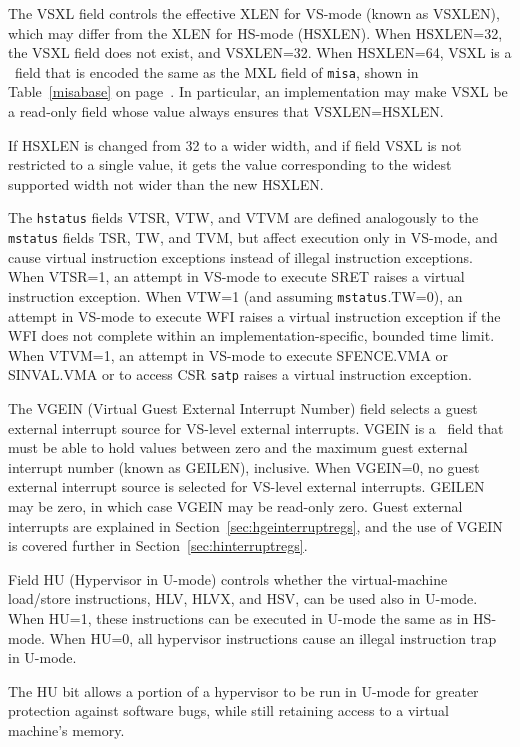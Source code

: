 The VSXL field controls the effective XLEN for VS-mode (known as VSXLEN),
which may differ from the XLEN for HS-mode (HSXLEN).
When HSXLEN=32, the VSXL field does not exist, and VSXLEN=32.
When HSXLEN=64, VSXL is a \warl\ field that is encoded the same as the
MXL field of {\tt misa}, shown in Table~\ref{misabase} on
page~\pageref{misabase}.
In particular, an implementation may make VSXL be a read-only field whose
value always ensures that VSXLEN=HSXLEN.

If HSXLEN is changed from 32 to a wider width, and if field VSXL is not
restricted to a single value, it gets the value corresponding to the
widest supported width not wider than the new HSXLEN.

The {\tt hstatus} fields VTSR, VTW, and VTVM are defined analogously to the
{\tt mstatus} fields TSR, TW, and TVM, but affect execution only in VS-mode,
and cause virtual instruction exceptions instead of illegal instruction
exceptions.
When VTSR=1, an attempt in VS-mode to execute SRET raises a virtual
instruction exception.
When VTW=1 (and assuming {\tt mstatus}.TW=0), an attempt in VS-mode to
execute WFI raises a virtual instruction exception if the WFI does not
complete within an implementation-specific, bounded time limit.
When VTVM=1, an attempt in VS-mode to execute SFENCE.VMA or SINVAL.VMA or to
access CSR {\tt satp} raises a virtual instruction exception.

The VGEIN (Virtual Guest External Interrupt Number) field selects a guest
external interrupt source for VS-level external interrupts.
VGEIN is a \wlrl\ field that must be able to hold values between zero
and the maximum guest external interrupt number (known as GEILEN),
inclusive.
When VGEIN=0, no guest external interrupt source is selected for VS-level
external interrupts.
GEILEN may be zero, in which case VGEIN may be read-only zero.
Guest external interrupts are explained in
Section~\ref{sec:hgeinterruptregs}, and the use of VGEIN is covered
further in Section~\ref{sec:hinterruptregs}.

Field HU (Hypervisor in U-mode) controls whether the virtual-machine
load/store instructions, HLV, HLVX, and HSV, can be used also in U-mode.
When HU=1, these instructions can be executed in U-mode the same as in
HS-mode.
When HU=0, all hypervisor instructions cause an illegal instruction trap
in U-mode.

\begin{commentary}
The HU bit allows a portion of a hypervisor to be run in U-mode for
greater protection against software bugs, while still retaining access to
a virtual machine's memory.
\end{commentary}

